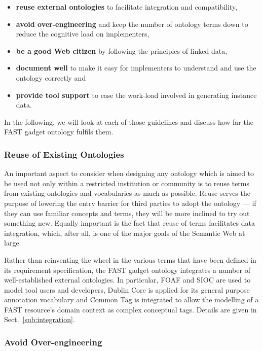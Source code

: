 \documentclass{article}
\begin{document}
\singlespacing
\begin{itemize}
	\item \textbf{reuse external ontologies} to facilitate integration and compatibility,
	\item \textbf{avoid over-engineering} and keep the number of ontology terms down to reduce the cognitive load on implementers,
	\item \textbf{be a good Web citizen} by following the principles of linked data,
	\item \textbf{document well} to make it easy for implementers to understand and use the ontology correctly and
	\item \textbf{provide tool support} to ease the work-load involved in generating instance data.
\end{itemize}
\doublespacing

In the following, we will look at each of those guidelines and discuss how far the FAST gadget ontology fulfils them.

\subsubsection{Reuse of Existing Ontologies} %
\label{ssub:reuse_of_existing_ontologies}

An important aspect to consider when designing any ontology which is aimed to be used not only within a restricted institution or community is to reuse terms from existing ontologies and vocabularies as much as possible. Reuse serves the purpose of lowering the entry barrier for third parties to adopt the ontology --- if they can use familiar concepts and terms, they will be more inclined to try out something new. Equally important is the fact that reuse of terms facilitates data integration, which, after all, is one of the major goals of the Semantic Web at large.

Rather than reinventing the wheel in the various terms that have been defined in its requirement specification, the FAST gadget ontology integrates a number of well-established external ontologies. In particular, FOAF and SIOC are used to model tool users and developers, Dublin Core is applied for its general purpose annotation vocabulary and Common Tag is integrated to allow the modelling of a FAST resource's domain context as complex conceptual tags. Details are given in Sect.~\ref{sub:integration}.

\subsubsection{Avoid Over-engineering} %
\label{ssub:avoid_of_over_engineering}
\end{document}

